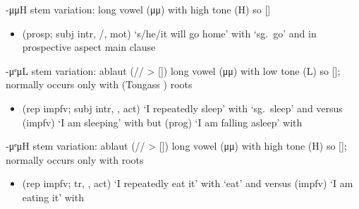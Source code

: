 \begin{morphdesc}[resume*=alphalist]
\item[-μμH]\label{m:-μμH}
	stem variation: long vowel (μμ) with high tone (H) so []
	\begin{itemize}
	\item	{} (prosp; subj intr, /, mot) ‘s/he/it will go home’
		with  ‘sg.\ go’ and 
		in prospective aspect main clause
	\end{itemize}

\item[-μᵉμL]\label{m:-μᵉμL}
	stem variation: ablaut (// > []) long vowel (μμ) with low tone (L) so [];
	normally occurs only with  (Tongass ) roots
	\begin{itemize}
	\item	{} (rep impfv; subj intr, ,  act) ‘I repeatedly sleep’
			with  ‘sg.\ sleep’ and \newline
		versus
		 (impfv) ‘I am sleeping’
			with \newline
		but  (prog) ‘I am falling asleep’
			with 
	\end{itemize}

\item[-μᵉμH]\label{m:-μᵉμH}
	stem variation: ablaut (// > []) long vowel (μμ) with high tone (H) so [];
	normally occurs only with  roots
	\begin{itemize}
	\item	{} (rep impfv; tr, ,  act) ‘I repeatedly eat it’
			with  ‘eat’ and \newline
		versus
		 (impfv) ‘I am eating it’
			with 
	\end{itemize}


\end{morphdesc}
